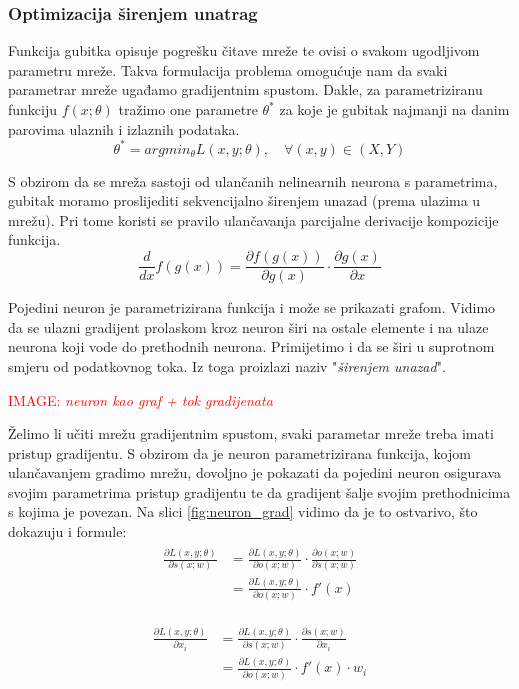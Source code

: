 \documentclass[times, utf8, diplomski]{fer}
\def\pfrac#1#2{\frac{\partial #1}{\partial #2}}
\def\dfrac#1#2{\frac{d #1}{d #2}}
\def\todoimg#1{\begin{center} \textcolor{red}{IMAGE: \textit{#1}} \end{center}}
\begin{document}
\subsubsection{Optimizacija širenjem unatrag}
\label{sec:backprop}
Funkcija gubitka opisuje pogrešku čitave mreže te ovisi o svakom ugodljivom parametru mreže. Takva formulacija problema omogućuje nam da svaki parametrar mreže ugađamo gradijentnim spustom. Dakle, za parametriziranu funkciju $f(x;\theta)$ tražimo one parametre $\theta^*$ za koje je gubitak najmanji na danim parovima ulaznih i izlaznih podataka.
\begin{equation}
\theta^* = argmin_\theta L(x,y; \theta), \quad \forall (x,y) \in (X,Y)
\end{equation}

S obzirom da se mreža sastoji od ulančanih nelinearnih neurona s parametrima, gubitak moramo proslijediti sekvencijalno širenjem unazad (prema ulazima u mrežu). Pri tome koristi se pravilo ulančavanja parcijalne derivacije kompozicije funkcija.
\begin{equation}
\dfrac{}{x} f(g(x)) = \pfrac{f(g(x))}{g(x)} \cdot \pfrac{g(x)}{x}
\end{equation}

Pojedini neuron je parametrizirana funkcija i može se prikazati grafom. Vidimo da se ulazni gradijent prolaskom kroz neuron širi na ostale elemente i na ulaze neurona koji vode do prethodnih neurona. Primijetimo i da se širi u suprotnom smjeru od podatkovnog toka. Iz toga proizlazi naziv "\textit{širenjem unazad}".

\todoimg{neuron kao graf + tok gradijenata}
\label{fig:neuron_grad}

Želimo li učiti mrežu gradijentnim spustom, svaki parametar mreže treba imati pristup gradijentu. S obzirom da je neuron parametrizirana funkcija, kojom ulančavanjem gradimo mrežu, dovoljno je pokazati da pojedini neuron osigurava svojim parametrima pristup gradijentu te da gradijent šalje svojim prethodnicima s kojima je povezan. Na slici \ref{fig:neuron_grad} vidimo da je to ostvarivo, što dokazuju i formule:
\begin{align}
\begin{split}
\pfrac{L(x,y;\theta)}{s(x;w)} &= \pfrac{L(x,y;\theta)}{o(x;w)} \cdot \pfrac{o(x;w)}{s(x;w)} \\
&= \pfrac{L(x,y;\theta)}{o(x;w)} \cdot f'(x)
\end{split}
\end{align}

\begin{align}
\begin{split}
\pfrac{L(x,y;\theta)}{x_i} &= \pfrac{L(x,y;\theta)}{s(x;w)} \cdot \pfrac{s(x;w)}{x_i} \\
&= \pfrac{L(x,y;\theta)}{o(x;w)} \cdot f'(x) \cdot w_i
\end{split}
\end{align}
\end{document}

